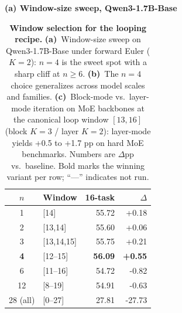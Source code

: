 \begin{table}[ht]
\centering
\setlength{\aboverulesep}{0pt}
\setlength{\belowrulesep}{0pt}
\caption{\textbf{Window selection for the looping recipe.} \textbf{(a)}~Window-size sweep on Qwen3-1.7B-Base under forward Euler ($K{=}2$): $n{=}4$ is the sweet spot with a sharp cliff at $n{\geq}6$. \textbf{(b)}~The $n{=}4$ choice generalizes across model scales and families. \textbf{(c)}~Block-mode vs.\ layer-mode iteration on MoE backbones at the canonical loop window $[13,16]$ (block $K{=}3$ / layer $K{=}2$): layer-mode yields +0.5 to +1.7 pp on hard MoE benchmarks. Numbers are $\Delta$pp vs.\ baseline. Bold marks the winning variant per row; ``---'' indicates not run.}
\label{tab:window-combined}
 
\begin{minipage}[t]{0.49\linewidth}
\centering
{\small\textbf{(a) Window-size sweep, Qwen3-1.7B-Base}}\par\vspace{3pt}
\scriptsize
\setlength{\tabcolsep}{4pt}
\renewcommand{\arraystretch}{1.18}
\begin{tabular}{@{}c l r r@{}}
\toprule
\textbf{$n$} & \textbf{Window} & \textbf{16-task} & \textbf{$\Delta$} \\
\midrule
1                  & [14]        & 55.72          & +0.18           \\
2                  & [13,14]     & 55.60          & +0.06           \\
3                  & [13,14,15]  & 55.75          & +0.21           \\
\textbf{4} & [12--15]    & \textbf{56.09} & \textbf{+0.55}  \\
6                  & [11--16]    & 54.72          & -0.82           \\
12                 & [8--19]     & 54.91          & -0.63          \\
28 (all)           & [0--27]     & 27.81          & -27.73          \\
\bottomrule
\end{tabular}
\par\vspace{2pt}
 
\vspace{3pt}
 

\end{minipage}
\end{table}
